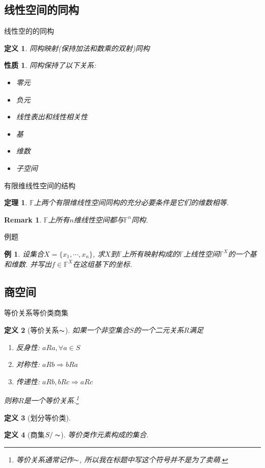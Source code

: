 \documentclass[11pt]{beamer}
\newtheorem{defi}{定义}[section]
\newtheorem{prop}{性质}[section]
\newtheorem{thrm}{定理}[section]
\newtheorem{exmp}{例}[section]
\newtheorem{rmk}{Remark}[section]
\begin{document}
\subsection{线性空间的同构}
\frame{\subsectionpage}

\begin{frame}{线性空的的同构}
\begin{defi}
	同构映射(保持加法和数乘的双射)\quad 同构
\end{defi}
\begin{prop}
	同构保持了以下关系:
	\begin{itemize}
		\item 零元
		\item 负元
		\item 线性表出和线性相关性
		\item 基
		\item 维数
		\item 子空间
	\end{itemize}
\end{prop}
\end{frame}

\begin{frame}{有限维线性空间的结构}
\begin{thrm}
	$\mathbb{F}$上两个有限维线性空间同构的充分必要条件是它们的维数相等.
\end{thrm}
\begin{rmk}
	$\mathbb{F}$上所有$n$维线性空间都与$\mathbb{F}^n$同构.
\end{rmk}
\end{frame}

\begin{frame}{例题}
	\begin{exmp}
		设集合$X=\{x_1,\cdots, x_n\}$, 求$X$到$\mathbb{F}$上所有映射构成的$\mathbb{F}$上线性空间$\mathbb{F}^X$的一个基和维数. 并写出$f\in\mathbb{F}^X$在这组基下的坐标.
	\end{exmp}
\end{frame}

\subsection{商空间}
\frame{\subsectionpage}

\begin{frame}{等价关系\quad 等价类\quad 商集}
	\begin{defi}[等价关系$\thicksim$]
		如果一个非空集合$S$的一个二元关系$R$满足
		\begin{enumerate}
			\item 反身性: $aRa, \forall a\in S$
			\item 对称性: $aRb\Rightarrow bRa$
			\item 传递性: $aRb, bRc\Rightarrow aRc$
		\end{enumerate}
		则称$R$是一个等价关系.\footnote{等价关系通常记作$\thicksim$, 所以我在标题中写这个符号并不是为了卖萌.}
	\end{defi}
	\begin{defi}[划分\quad 等价类]
	\end{defi}
	\begin{defi}[商集$S/\thicksim$]
		等价类作元素构成的集合.
	\end{defi}
\end{frame}
\end{document}
